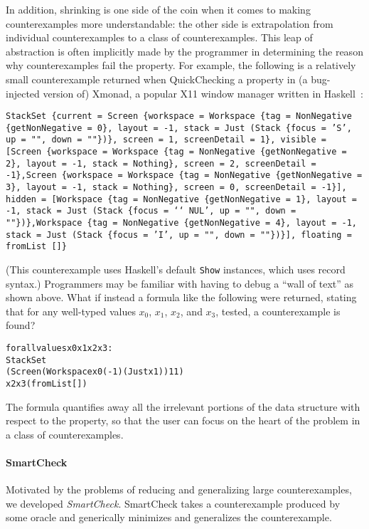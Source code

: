 \documentclass{sigplanconf}
\newenvironment{code}{\begin{alltt}\footnotesize}{\end{alltt}}
\newcommand{\ttp}[1]{\texttt{#1}}
\begin{document}
In addition, shrinking is one side of the coin when it comes to making
counterexamples more understandable: the other side is extrapolation from
individual counterexamples to a class of counterexamples.  This leap of
abstraction is often implicitly made by the programmer in determining the reason
why counterexamples fail the property.  For example, the following is a
relatively small counterexample returned when QuickChecking a property in (a
bug-injected version of) Xmonad, a popular X11 window manager written in
Haskell~\cite{xmonad}:
%
\medskip%
\begin{sloppypar}
\noindent%
\ttp{StackSet \{current = Screen \{workspace = Workspace \{tag = NonNegative
      \{getNonNegative = 0\}, layout = -1, stack = Just (Stack \{focus = 'S', up =
        "", down = ""\})\}, screen = 1, screenDetail = 1\}, visible = [Screen
    \{workspace = Workspace \{tag = NonNegative \{getNonNegative = 2\}, layout = -1,
        stack = Nothing\}, screen = 2, screenDetail = -1\},Screen \{workspace =
      Workspace \{tag = NonNegative \{getNonNegative = 3\}, layout = -1, stack =
        Nothing\}, screen = 0, screenDetail = -1\}], hidden = [Workspace \{tag =
      NonNegative \{getNonNegative = 1\}, layout = -1, stack = Just (Stack \{focus
        = `\char`\\NUL', up = "", down = ""\})\},Workspace \{tag = NonNegative
      \{getNonNegative = 4\}, layout = -1, stack = Just (Stack \{focus = 'I', up =
        "", down = ""\})\}], floating = fromList []\} }
\end{sloppypar}
\medskip%
\noindent
(This counterexample uses Haskell's default \ttp{Show} instances, which uses
record syntax.)  Programmers may be familiar with having to debug
a ``wall of text'' as shown above.  What if instead a
formula like the following were returned, stating that for any well-typed
values $x_0$, $x_1$, $x_2$, and $x_3$, tested, a counterexample is found?

%
\begin{samepage}
\begin{code}
forall values x0 x1 x2 x3:
  StackSet
    (Screen (Workspace x0 (-1) (Just x1)) 1 1)
    x2 x3 (fromList [])
\end{code}
\end{samepage}
%
\noindent
The formula quantifies away all the irrelevant portions of the data structure
with respect to the property, so that the user can focus on the heart of the
problem in a class of counterexamples.

\paragraph{SmartCheck}
Motivated by the problems of reducing and generalizing large counterexamples, we
developed \emph{SmartCheck}.  SmartCheck takes a counterexample produced by some
oracle and generically minimizes and generalizes the counterexample.
\end{document}
